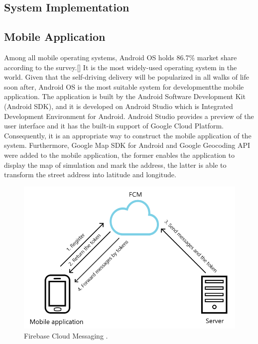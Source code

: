 \documentclass[12pt]{ksthesis}
\begin{document}
\begin{thesis}
{  



\chapter{System Implementation}\label{Chap:System_Implementation}

\section{Mobile Application}


Among all mobile operating systems, Android OS holds 86.7\% market share according to the survey.[] It is the most widely-used operating system in the world. Given that the self-driving delivery will be popularized in all walks of life soon after, Android OS is the most suitable system for developmentthe mobile application. The application is built by the Android Software Development Kit (Android SDK), and it is developed on Android Studio which is Integrated Development Environment for Android. Android Studio provides a preview of the user interface and it has the built-in support of Google Cloud Platform. Consequently, it is an appropriate way to construct the mobile application of the system. Furthermore, Google Map SDK for Android and Google Geocoding API were added to the mobile application, the former enables the application to display the map of simulation and mark the address, the latter is able to transform the street address into latitude and longitude.

\begin{figure}[H]
\centering
\includegraphics[width=1.0\textwidth]{./figures/F4-1_FCM.PNG}
\caption{\large Firebase Cloud Messaging .}
\vspace{0.5cm}
\label{Fig:FCM}
\end{figure}

}
\end{thesis}
\end{document}
